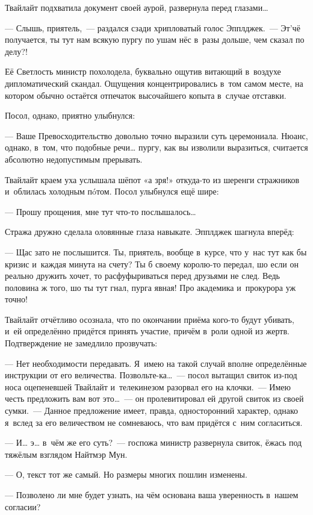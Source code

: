 \documentclass[twoside,a5paper,12pt]{extbook}
\begin{document}
Твайлайт подхватила документ своей аурой, развернула перед глазами…

—  Слышь, приятель, — раздался сзади хрипловатый голос Эпплджек. — Эт’чё получается, ты тут нам всякую пургу по ушам нёс в разы дольше, чем сказал по делу?!

Её Светлость министр похолодела, буквально ощутив витающий в воздухе дипломатический скандал. Ощущения концентрировались в том самом месте, на котором обычно остаётся отпечаток высочайшего копыта в случае отставки.

Посол, однако, приятно улыбнулся:

— Ваше Превосходительство довольно точно выразили суть церемониала. Нюанс, однако, в том, что подобные речи… пургу, как вы изволили выразиться, считается абсолютно недопустимым прерывать.

Твайлайт краем уха услышала шёпот «а зря!» откуда-то из шеренги стражников и облилась холодным пóтом. Посол улыбнулся ещё шире:

— Прошу прощения, мне тут что-то послышалось…

Стража дружно сделала оловянные глаза навыкате. Эпплджек шагнула вперёд:

— Щас зато не послышится. Ты, приятель, вообще в курсе, что у нас тут как бы кризис и каждая минута на счету? Ты б своему королю-то передал, шо если он реально дружить хочет, то расфуфыриваться перед друзьями не след. Ведь половина ж того, шо ты тут гнал, пурга явная! Про академика и прокурора уж точно!

Твайлайт отчётливо осознала, что по окончании приёма кого-то будут убивать, и ей определённо придётся принять участие, причём в роли одной из жертв. Подтверждение не замедлило прозвучать:

— Нет необходимости передавать. Я имею на такой случай вполне определённые инструкции от его величества. Позвольте-ка… — посол вытащил свиток из-под носа оцепеневшей Твайлайт и телекинезом разорвал его на клочки. — Имею честь предложить вам вот это… — он пролевитировал ей другой свиток из своей сумки. — Данное предложение имеет, правда, односторонний характер, однако я вслед за его величеством не сомневаюсь, что вам придётся с ним согласиться.

— И… э… в чём же его суть? — госпожа министр развернула свиток, ёжась под тяжёлым взглядом Найтмэр Мун.

— О, текст тот же самый. Но размеры многих пошлин изменены.

— Позволено ли мне будет узнать, на чём основана ваша уверенность в нашем согласии?
\end{document}
